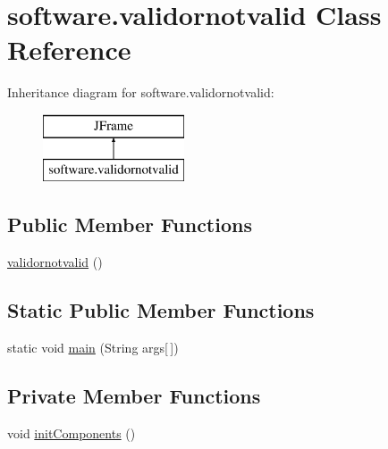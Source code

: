\hypertarget{classsoftware_1_1validornotvalid}{}\section{software.\+validornotvalid Class Reference}
\label{classsoftware_1_1validornotvalid}
Inheritance diagram for software.\+validornotvalid\+:\begin{figure}[H]
\begin{center}
\leavevmode
\includegraphics[height=2.000000cm]{classsoftware_1_1validornotvalid}
\end{center}
\end{figure}
\subsection*{Public Member Functions}
\begin{DoxyCompactItemize}
\item 
\mbox{\hyperlink{classsoftware_1_1validornotvalid_af537676fcb9f27ef30b7c7375f4f46f9}{validornotvalid}} ()
\end{DoxyCompactItemize}
\subsection*{Static Public Member Functions}
\begin{DoxyCompactItemize}
\item 
static void \mbox{\hyperlink{classsoftware_1_1validornotvalid_a0470609728096a74f5c382a5ec31ab58}{main}} (String args\mbox{[}$\,$\mbox{]})
\end{DoxyCompactItemize}
\subsection*{Private Member Functions}
\begin{DoxyCompactItemize}
\item 
void \mbox{\hyperlink{classsoftware_1_1validornotvalid_a4ee4101bb8596e95283aafd09e54fef5}{init\+Components}} ()
\end{DoxyCompactItemize}
